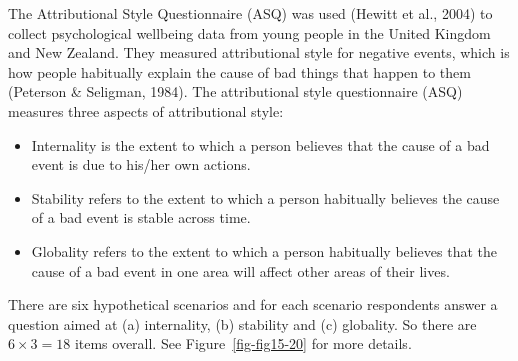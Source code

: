 \documentclass[
  a4paper,
]{book}
\begin{document}
The Attributional Style Questionnaire (ASQ) was used (Hewitt et al.,
2004) to collect psychological wellbeing data from young people in the
United Kingdom and New Zealand. They measured attributional style for
negative events, which is how people habitually explain the cause of bad
things that happen to them (Peterson \& Seligman, 1984). The
attributional style questionnaire (ASQ) measures three aspects of
attributional style:

\begin{itemize}
\item
  Internality is the extent to which a person believes that the cause of
  a bad event is due to his/her own actions.
\item
  Stability refers to the extent to which a person habitually believes
  the cause of a bad event is stable across time.
\item
  Globality refers to the extent to which a person habitually believes
  that the cause of a bad event in one area will affect other areas of
  their lives.
\end{itemize}

There are six hypothetical scenarios and for each scenario respondents
answer a question aimed at (a) internality, (b) stability and (c)
globality. So there are \(6 \times 3 = 18\) items overall. See
Figure~\ref{fig-fig15-20} for more details.
\end{document}
